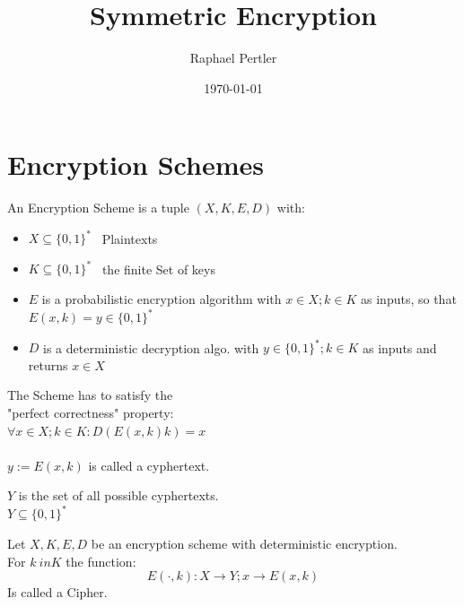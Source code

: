 \documentclass[twocolumn]{article}
\title{\textbf{Symmetric Encryption }}
\author{ Raphael Pertler }
\date{\today}
\begin{document}
\maketitle

\section*{Encryption Schemes}

\begin{question}
  An Encryption Scheme is a tuple \( (X,K,E,D) \) with:
  \begin{itemize}
    \item \(X \subseteq \{0,1\}^*\) \ Plaintexts
    \item \(K \subseteq \{0,1\}^*\) \ the finite Set of keys
    \item \(E\) is a probabilistic encryption algorithm with \(x \in X ; k \in K\) as inputs, so that \(E (x,k) = y \in \{0,1\}^*\)
    \item \(D\) is a deterministic decryption algo. with \(y \in \{0,1\}^* ; k \in K\) as inputs and returns \(x\in X\)
  \end{itemize}
  The Scheme has to satisfy the \\ "perfect correctness" property: \\
  \(\forall x \in X ; k \in K : D(E(x,k)k) = x \) \\ \\

  \(y := E(x,k)\) is called a cyphertext.

  \(Y\) is the set of all possible cyphertexts. \\
  \(Y \subseteq \{0,1\}^*\)
\end{question}

\begin{question}
  Let \(X,K,E,D\) be an encryption scheme with deterministic encryption. \\ For \(
  k \ in K \) the function: \\ \[ E(\cdot,k) : X \rightarrow Y ; x \rightarrow E(x,
  k) \] Is called a Cipher.
\end{question}
\end{document}
